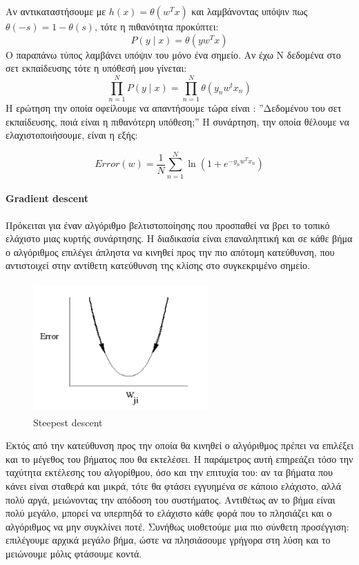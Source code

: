 \documentclass{article}
\begin{document}
Αν αντικαταστήσουμε με $h(x)=\theta(w^T x)$ και λαμβάνοντας υπόψιν πως $\theta(-s)= 1 - \theta(s)$, τότε η πιθανότητα  προκύπτει:
$$P(y \mid x)= \theta(y w^T x)$$
Ο παραπάνω τύπος λαμβάνει υπόψιν του μόνο ένα σημείο. Αν έχω N δεδομένα στο σετ εκπαίδευσης τότε η υπόθεσή μου γίνεται:
$$\prod_{n=1}^{N} P(y \mid x)= \prod_{n=1}^{N} \theta (y_n w^t x_n)$$
Η ερώτηση την οποία οφείλουμε να απαντήσουμε τώρα είναι : ”Δεδομένου του σετ εκπαίδευσης, ποιά είναι η πιθανότερη υπόθεση;” Η συνάρτηση, την οποία θέλουμε να ελαχιστοποιήσουμε, είναι η εξής:

$$Error(w)= \frac{1}{N} \sum_{n=1}^{N} \ln (1 + e^{- y_n w^T x_n} )$$

\paragraph{Gradient descent} Πρόκειται για έναν αλγόριθμο βελτιστοποίησης που προσπαθεί να βρει το τοπικό ελάχιστο μιας κυρτής συνάρτησης. Η διαδικασία είναι επαναληπτική και σε κάθε βήμα ο αλγόριθμος επιλέγει άπληστα να κινηθεί προς την πιο απότομη κατεύθυνση, που αντιστοιχεί στην αντίθετη κατεύθυνση της κλίσης στο συγκεκριμένο σημείο.
\begin{figure}[H]
	\centering			
    \includegraphics[width=0.6\textwidth, height=5cm]{gradient.png}
    \caption[Steepest descent]{Steepest descent}
 \end{figure}
 Εκτός από την κατεύθυνση προς την οποία θα κινηθεί ο αλγόριθμος πρέπει να επιλέξει και το μέγεθος του βήματος που θα εκτελέσει. Η παράμετρος αυτή επηρεάζει τόσο την ταχύτητα εκτέλεσης του αλγορίθμου, όσο και την επιτυχία του: αν τα βήματα που κάνει είναι σταθερά και μικρά, τότε θα φτάσει εγγυημένα σε κάποιο ελάχιστο, αλλά πολύ αργά, μειώνοντας την απόδοση του συστήματος. Αντιθέτως αν το βήμα είναι πολύ μεγάλο, μπορεί να υπερπηδά το ελάχιστο κάθε φορά που το πλησιάζει και ο αλγόριθμος να μην συγκλίνει ποτέ. Συνήθως υιοθετούμε μια πιο σύνθετη προσέγγιση: επιλέγουμε αρχικά μεγάλο βήμα, ώστε να πλησιάσουμε γρήγορα στη λύση και το μειώνουμε μόλις φτάσουμε κοντά.
\end{document}
